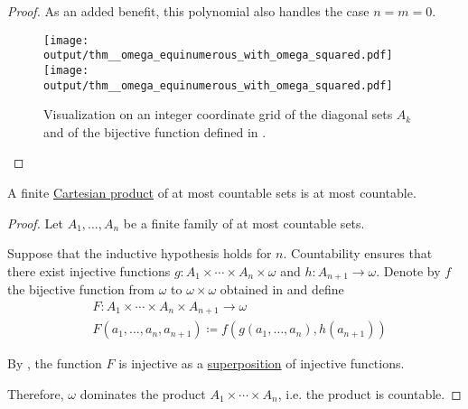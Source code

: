 \begin{proof}
  As an added benefit, this polynomial also handles the case \( n = m = 0 \).

  \begin{figure}
    \hfill
    \texttt{[image: output/thm\_\_omega\_equinumerous\_with\_omega\_squared.pdf]}
    \hfill
    \texttt{[image: output/thm\_\_omega\_equinumerous\_with\_omega\_squared.pdf]}
    \hfill\hfill
    \caption{Visualization on an integer coordinate grid of the diagonal sets \( A_k \) and of the bijective function defined in .}\label{fig:thm:omega_equinumerous_with_omega_squared}
  \end{figure}
\end{proof}

\begin{corollary}\label{thm:countable_product_of_countable_sets}
  A finite \hyperref[def:cartesian_product]{Cartesian product} of at most countable sets is at most countable.
\end{corollary}
\begin{proof}
  Let \( A_1, \ldots, A_n \) be a finite family of at most countable sets.

  Suppose that the inductive hypothesis holds for \( n \). Countability ensures that there exist injective functions \( g: A_1 \times \cdots \times A_n \times \omega \) and \( h: A_{n+1} \to \omega \). Denote by \( f \) the bijective function from \( \omega \) to \( \omega \times \omega \) obtained in  and define
  \begin{equation*}
    \begin{aligned}
      &F: A_1 \times \cdots \times A_n \times A_{n+1} \to \omega \\
      &F(a_1, \ldots, a_n, a_{n+1}) \coloneqq f(g(a_1, \ldots, a_n), h(a_{n+1}))
    \end{aligned}
  \end{equation*}

  By , the function \( F \) is injective as a \hyperref[def:multi_valued_function/superposition]{superposition} of injective functions.

  Therefore, \( \omega \) dominates the product \( A_1 \times \cdots \times A_n \), i.e. the product is countable.
\end{proof}

